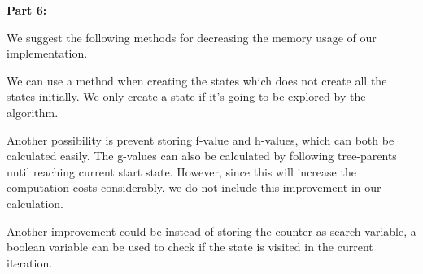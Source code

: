 \documentclass[12pt]{amsart}
\begin{document}
\noindent \textbf{Part  6:}

We suggest the following methods for decreasing the memory usage of our implementation. 

We can use a method when creating the states which does not  create all the states initially. We only create a state if it's going to be explored by the algorithm.

Another possibility is prevent storing f-value and h-values, which can both be calculated easily. The g-values can also be calculated by following tree-parents until reaching current start state. However, since this will increase the computation costs considerably, we do not include this improvement in our calculation. 

 Another improvement could be instead of storing the counter as search variable, a boolean variable can be used to check if the state is visited in the current iteration.
 
 
\end{document}
